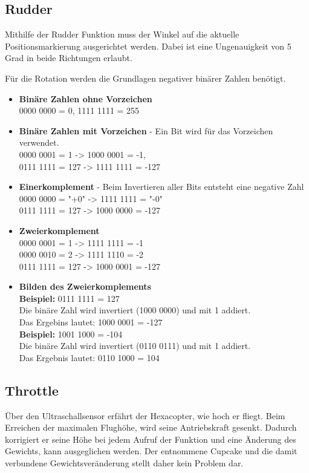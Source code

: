     \subsection*{Rudder}
    Mithilfe der Rudder Funktion muss der Winkel auf die aktuelle Positionsmarkierung ausgerichtet werden. Dabei ist eine Ungenauigkeit von 5 Grad in beide Richtungen erlaubt.

    Für die Rotation werden die Grundlagen negativer binärer Zahlen benötigt.

    \begin{itemize}
    \item \textbf{Binäre Zahlen ohne Vorzeichen}\\
    0000 0000 = 0, 1111 1111 = 255
    \item \textbf{Binäre Zahlen mit Vorzeichen} - Ein Bit wird für das Vorzeichen verwendet. \\
    0000 0001 = 1 -> 1000 0001 = -1, \\
    0111 1111 = 127 -> 1111 1111 = -127
    \item \textbf{Einerkomplement} - Beim Invertieren aller Bits entsteht eine negative Zahl \\
    0000 0000 = "+0" -> 1111 1111 = "-0" \\
    0111 1111 = 127 -> 1000 0000 = -127
    \item \textbf{Zweierkomplement}\\
    0000 0001 = 1 -> 1111 1111 = -1 \\
    0000 0010 = 2 -> 1111 1110 = -2 \\
    0111 1111 = 127 -> 1000 0001 = -127
    \item \textbf{Bilden des Zweierkomplements}\\
    \textbf{Beispiel:} 0111 1111 = 127 \\
    Die binäre Zahl wird invertiert (1000 0000) und mit 1 addiert. \\
    Das Ergebins lautet: 1000 0001 = -127 \\
    \textbf{Beispiel:} 1001 1000 = -104 \\
    Die binäre Zahl wird invertiert (0110 0111) und mit 1 addiert. \\
    Das Ergebnis lautet: 0110 1000 = 104 \\
    \end{itemize}


    \subsection*{Throttle}
    Über den Ultraschallsensor erfährt der Hexacopter, wie hoch er fliegt. Beim Erreichen der maximalen Flughöhe, wird seine Antriebskraft gesenkt. Dadurch korrigiert er seine Höhe bei jedem Aufruf der Funktion und eine Änderung des Gewichts, kann ausgeglichen werden. Der entnommene Cupcake und die damit verbundene Gewichtsveränderung stellt daher kein Problem dar.


